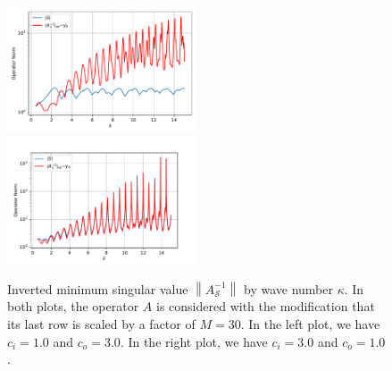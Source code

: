 \documentclass[12pt,journal,compsoc, onecolumn]{IEEEtran}
\begin{document}
\begin{figure}
    \includegraphics[width=0.5\textwidth]{simulation_scenario_13indexrange_-30.0-0.0_y_0_0.5643627199145966.pdf}
    \includegraphics[width=0.5\textwidth]{simulation_scenario_12indexrange_-22.0-0.0_y_0_0.28667109315776407.pdf} 
    \caption{Inverted minimum singular value $\left\|A_{\mathcal{S}}^{-1}\right\|$ by wave number $\kappa$. In both plots, the operator $A$ is considered with the modification that its last row is scaled by a factor of $M = 30$.
    In the left plot, we have $c_i = 1.0$ and $c_o = 3.0$. In the right plot, we have $c_i = 3.0$ and $c_o = 1.0$.}
    
   \label{fig:scaled_third_equation}
\end{figure}
\end{document}

